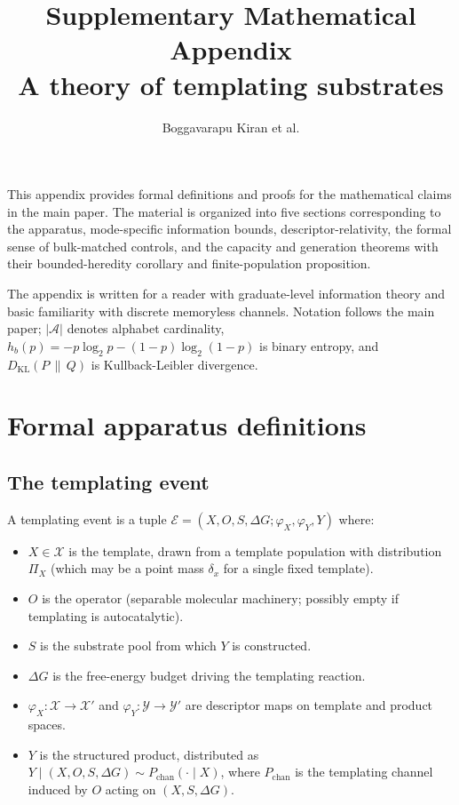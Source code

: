 \documentclass[11pt]{article}
\title{Supplementary Mathematical Appendix\\
\large A theory of templating substrates}
\author{Boggavarapu Kiran et al.}
\date{}
\theoremstyle{plain}
\theoremstyle{definition}
\newcommand{\Hbin}{h_b}
\newcommand{\descX}{\varphi_X}
\newcommand{\descY}{\varphi_Y}
\newcommand{\KL}[2]{D_{\mathrm{KL}}\!\left(#1 \,\|\, #2\right)}
\begin{document}
\maketitle

\noindent
This appendix provides formal definitions and proofs for the mathematical claims in the main paper. The material is organized into five sections corresponding to the apparatus, mode-specific information bounds, descriptor-relativity, the formal sense of bulk-matched controls, and the capacity and generation theorems with their bounded-heredity corollary and finite-population proposition.

The appendix is written for a reader with graduate-level information theory \citep{CoverThomas2006} and basic familiarity with discrete memoryless channels. Notation follows the main paper; $|\mathcal{A}|$ denotes alphabet cardinality, $\Hbin(p) = -p \log_2 p - (1-p) \log_2 (1-p)$ is binary entropy, and $\KL{P}{Q}$ is Kullback-Leibler divergence.

\tableofcontents
\bigskip

\section{Formal apparatus definitions}

\subsection{The templating event}

A templating event is a tuple $\mathcal{E} = (X, O, S, \Delta G; \descX, \descY, Y)$ where:
\begin{itemize}
  \item $X \in \mathcal{X}$ is the template, drawn from a template population with distribution $\Pi_X$ (which may be a point mass $\delta_x$ for a single fixed template).
  \item $O$ is the operator (separable molecular machinery; possibly empty if templating is autocatalytic).
  \item $S$ is the substrate pool from which $Y$ is constructed.
  \item $\Delta G$ is the free-energy budget driving the templating reaction.
  \item $\descX: \mathcal{X} \to \mathcal{X}'$ and $\descY: \mathcal{Y} \to \mathcal{Y}'$ are descriptor maps on template and product spaces.
  \item $Y$ is the structured product, distributed as $Y \mid (X, O, S, \Delta G) \sim P_{\mathrm{chan}}(\cdot \mid X)$, where $P_{\mathrm{chan}}$ is the templating channel induced by $O$ acting on $(X, S, \Delta G)$.
\end{itemize}
\end{document}
